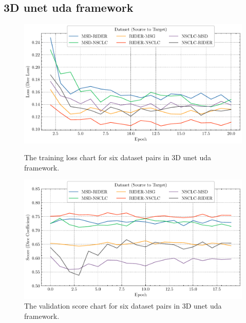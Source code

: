 \documentclass[11pt,times,oneside,openright]{eeereport}
\begin{document}
\begin{appendices}
\section{3D \acrshort{unet} \acrshort{uda} framework}
\begin{figure}[!htb]
   \begin{minipage}{0.48\textwidth}
     \centering
     \includegraphics[width=\linewidth]{fig/result/seg_uda_train.pdf}
     \caption{The training loss chart for six dataset pairs in 3D \acrshort{unet} \acrshort{uda} framework.}\label{fig:app_seg_uda_train}
   \end{minipage}\hfill
   \begin{minipage}{0.48\textwidth}
     \centering
     \includegraphics[width=\linewidth]{fig/result/seg_uda_val.pdf}
     \caption{The validation score chart for six dataset pairs in 3D \acrshort{unet} \acrshort{uda} framework.
}\label{fig:app_seg_uda_val}
   \end{minipage}
\end{figure}


\end{appendices}
\end{document}
